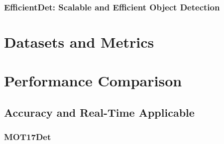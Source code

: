 \documentclass[12pt, oneside]{article}
\begin{document}
\subsubsection{EfficientDet: Scalable and Efficient Object Detection}

\vfill

\section{Datasets and Metrics}

\vfill

\section{Performance Comparison}

\vfill

\subsection{Accuracy and Real-Time Applicable}


\subsubsection{MOT17Det}
\end{document}
